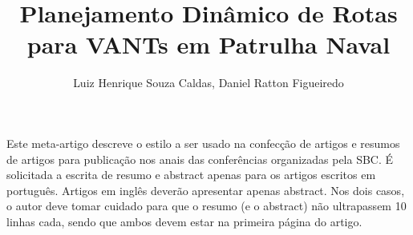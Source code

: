 \documentclass[12pt]{article}
\title{Planejamento Dinâmico de Rotas para VANTs em Patrulha Naval}
\author{Luiz Henrique Souza Caldas\inst{1}, Daniel Ratton Figueiredo\inst{1}}
\begin{document}
 

\maketitle
     
\begin{resumo} 
  Este meta-artigo descreve o estilo a ser usado na confecção de artigos e
  resumos de artigos para publicação nos anais das conferências organizadas
  pela SBC. É solicitada a escrita de resumo e abstract apenas para os artigos
  escritos em português. Artigos em inglês deverão apresentar apenas abstract.
  Nos dois casos, o autor deve tomar cuidado para que o resumo (e o abstract)
  não ultrapassem 10 linhas cada, sendo que ambos devem estar na primeira
  página do artigo.
\end{resumo}









\end{document}
